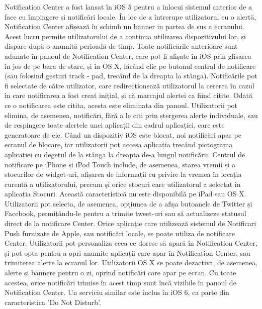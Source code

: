 \documentclass[conference]{IEEEtran}
\begin{document}
Notification Center a fost lansat în iOS 5 pentru a inlocui sistemul anterior de a face cu împingere și notificări locale. În loc de a întrerupe utilizatorul cu o alertă, Notification Center afișează în schimb un banner in partea de sus a ecranului. Acest lucru permite utilizatorului de a continua utilizarea dispozitivului lor, și dispare după o anumită perioadă de timp. Toate notificările anterioare sunt adunate în panoul de Notification Center, care pot fi afișate în iOS prin glisarea în jos de pe bara de stare, și în OS X, făcând clic pe butonul central de notificare (sau folosind gesturi track - pad, trecând de la dreapta la stânga). Notificările pot fi selectate de către utilizator, care redirecționează utilizatorul la cererea în cazul în care notificarea a fost creat inițial, și că marcajul alertei ca fiind citite. Odată ce o notificarea este citita, acesta este eliminata din panoul. Utilizatorii pot elimina, de asemenea, notificări, fără a le citi prin ștergerea alerte individuale, sau de respingere toate alertele unei aplicații din cadrul aplicației, care este generatoare de ele. Când un dispozitiv iOS este blocat, noi notificări apar pe ecranul de blocare, iar utilizatorii pot accesa aplicația trecând pictograma aplicației cu degetul de la stânga la dreapta de-a lungul notificării.
Centrul de notificare pe iPhone și iPod Touch include, de asemenea, starea vremii și a stocurilor de widget-uri, afișarea de informații cu privire la vremea în locația curentă a utilizatorului, precum și orice stocuri care utilizatorul a selectat în aplicația Stocuri. Această caracteristică nu este disponibilă pe iPad sau OS X. Utilizatorii pot selecta, de asemenea, opțiunea de a afișa butoanele de Twitter și Facebook, permițându-le pentru a trimite tweet-uri sau să actualizeze statusul direct de la notificare Center.
Orice aplicație care utilizează sistemul de Notificari Push furnizate de Apple, sau notificări locale, se poate utiliza de notificare Center. Utilizatorii pot personaliza ceea ce doresc să apară în Notification Center, și pot opta pentru a opri anumite aplicații care apar în Notification Center, sau trimiterea alerte la ecranul lor. Utilizatorii OS X se poate dezactiva, de asemenea, alerte și bannere pentru o zi, oprind notificări care apar pe ecran. Cu toate acestea, orice notificări trimise în acest timp sunt încă vizibile în panoul de Notification Center. Un serviciu similar este inclus în iOS 6, ca parte din caracteristica 'Do Not Disturb'.
\end{document}
